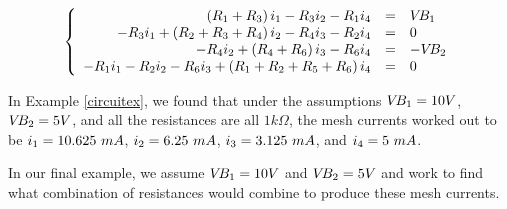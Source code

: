 \documentclass{ximera}
\begin{document}
\[ \left\{ \begin{array}{rcl} \left(R_{\text{\scriptsize$1$}} + R_{\text{\scriptsize$3$}}\right)i_{\text{\scriptsize$1$}} - R_{\text{\scriptsize$3$}}i_{\text{\scriptsize$2$}} - R_{\text{\scriptsize$1$}}i_{\text{\scriptsize$4$}} & = & V\!B_{\text{\scriptsize$1$}} \\
-R_{\text{\scriptsize$3$}}i_{\text{\scriptsize$1$}} + \left(R_{\text{\scriptsize$2$}} + R_{\text{\scriptsize$3$}} + R_{\text{\scriptsize$4$}}\right)i_{\text{\scriptsize$2$}} - R_{\text{\scriptsize$4$}}i_{\text{\scriptsize$3$}} - R_{\text{\scriptsize$2$}}i_{\text{\scriptsize$4$}} & = & 0 \\
-R_{\text{\scriptsize$4$}}i_{\text{\scriptsize$2$}} + \left(R_{\text{\scriptsize$4$}} + R_{\text{\scriptsize$6$}}\right)i_{\text{\scriptsize$3$}} - R_{\text{\scriptsize$6$}}i_{\text{\scriptsize$4$}} & = & -V\!B_{\text{\scriptsize$2$}} \\
-R_{\text{\scriptsize$1$}}i_{\text{\scriptsize$1$}} - R_{\text{\scriptsize$2$}}i_{\text{\scriptsize$2$}} - R_{\text{\scriptsize$6$}}i_{\text{\scriptsize$3$}} + \left(R_{\text{\scriptsize$1$}} + R_{\text{\scriptsize$2$}} + R_{\text{\scriptsize$5$}} + R_{\text{\scriptsize$6$}}\right)i_{\text{\scriptsize$4$}} & = & 0 \\  \end{array} \right.\]

In Example \ref{circuitex}, we found that under the assumptions $V\!B_{\text{\scriptsize$1$}} = 10 V$, $V\!B_{\text{\scriptsize$2$}} = 5 V$, and all  the resistances are all $1 k\Omega$, the mesh currents worked out to be $i_{\text{\scriptsize$1$}} = 10.625 \, \, mA$, $i_{\text{\scriptsize$2$}} = 6.25 \, \, mA$, $i_{\text{\scriptsize$3$}} = 3.125 \, \, mA$, and $i_{\text{\scriptsize$4$}} = 5 \, \, mA$. 

 In our final example, we assume  $V\!B_{\text{\scriptsize$1$}} = 10 V$ and  $V\!B_{\text{\scriptsize$2$}} = 5 V$  and work to find what combination of resistances would combine to produce these mesh currents.
 
\end{document}
